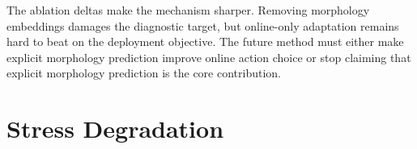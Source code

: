 \documentclass{article}
\begin{document}
\begin{table}[t]
\centering
\scriptsize
{}
\caption{Full V5 minus ablation or variant. The online-only variant exposes the core weakness: adaptation can beat explicit morphology prediction on deployment utility.}
\label{tab:ablationdelta}
\end{table}


The ablation deltas make the mechanism sharper. Removing morphology embeddings damages the diagnostic target, but online-only adaptation remains hard to beat on the deployment objective. The future method must either make explicit morphology prediction improve online action choice or stop claiming that explicit morphology prediction is the core contribution.

\section{Stress Degradation}
\end{document}
